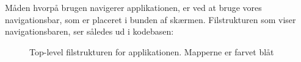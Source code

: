 Måden hvorpå brugen navigerer applikationen, er ved at bruge vores navigationsbar, som er placeret i bunden af skærmen. 
Filstrukturen som viser navigationsbaren, ser således ud i kodebasen:
\begin{figure}[H]
    \caption{Top-level filstrukturen for applikationen. Mapperne er farvet blåt}
    \label{fig:tlprojstruct}
\end{figure}